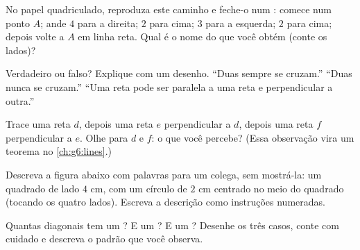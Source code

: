 \begin{exercise}[$\star$]\label{exo:g4:geometry:7}
No papel quadriculado, reproduza este caminho e feche-o num :
comece num ponto $A$; ande $4$ para a direita; $2$ para cima; $3$
para a esquerda; $2$ para cima; depois volte a $A$ em linha reta.
Qual é o nome do  que você obtém (conte os lados)?
\end{exercise}

\begin{exercise}[$\star$]\label{exo:g4:geometry:8}
Verdadeiro ou falso? Explique com um desenho.
``Duas  sempre se cruzam.''
``Duas  nunca se cruzam.''
``Uma reta pode ser paralela a uma reta e perpendicular a outra.''
\end{exercise}

\begin{exercise}[$\star\star$]\label{exo:g4:geometry:9}
Trace uma reta $d$, depois uma reta $e$ perpendicular a $d$, depois
uma reta $f$ perpendicular a $e$. Olhe para $d$ e $f$: o que você
percebe? (Essa observação vira um teorema no \cref{ch:g6:lines}.)
\end{exercise}

\begin{exercise}[$\star\star$]\label{exo:g4:geometry:10}
Descreva a figura abaixo com palavras para um colega, sem mostrá-la:
um quadrado de lado $4$ cm, com um círculo de  $2$ cm centrado no
meio do quadrado (tocando os quatro lados). Escreva a descrição como
instruções numeradas.
\end{exercise}

\begin{exercise}[$\star\star$]\label{exo:g4:geometry:11}
Quantas diagonais tem um ? E um ? E um
? Desenhe os três casos, conte com cuidado e descreva o
padrão que você observa.
\end{exercise}
